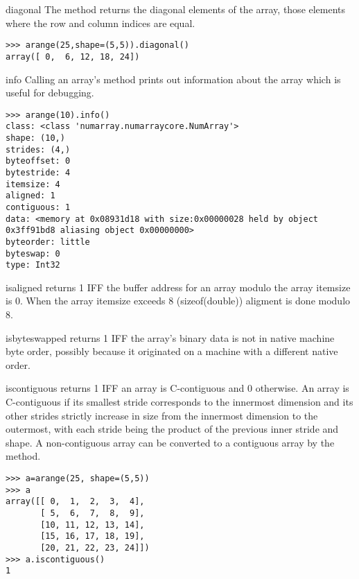 \begin{methoddesc}[numarray]{diagonal}{}
  \label{arraymethod:diagonal}
   The  method returns the diagonal elements of the array,
   those elements where the row and column indices are equal.
\begin{verbatim}
>>> arange(25,shape=(5,5)).diagonal()
array([ 0,  6, 12, 18, 24])
\end{verbatim}
\end{methoddesc}


\begin{methoddesc}[numarray]{info}{}
   \label{arraymethod:info} Calling an array's 
   method prints out information about the array which is useful for debugging.
\begin{verbatim}
>>> arange(10).info()
class: <class 'numarray.numarraycore.NumArray'>
shape: (10,)
strides: (4,)
byteoffset: 0
bytestride: 4
itemsize: 4
aligned: 1
contiguous: 1
data: <memory at 0x08931d18 with size:0x00000028 held by object 0x3ff91bd8 aliasing object 0x00000000>
byteorder: little
byteswap: 0
type: Int32
\end{verbatim}
\end{methoddesc}


\begin{methoddesc}[numarray]{isaligned}{}
  \label{arraymethod:isaligned}  returns 1 IFF the buffer
  address for an array modulo the array itemsize is 0.  When the array
  itemsize exceeds 8 (sizeof(double)) aligment is done modulo 8.
\end{methoddesc}


\begin{methoddesc}[numarray]{isbyteswapped}{}
  \label{arraymethod:isbyteswapped}  returns 1 IFF the 
  array's binary data is not in native machine byte order, possibly because it
  originated on a machine with a different native order.
\end{methoddesc}


\begin{methoddesc}[numarray]{iscontiguous}{}
  \label{arraymethod:iscontiguous}  returns 1 IFF
   an array is C-contiguous and 0 otherwise.  An array is C-contiguous if its
   smallest stride corresponds to the innermost dimension and its other strides
   strictly increase in size from the innermost dimension to the outermost,
   with each stride being the product of the previous inner stride and shape.
   A non-contiguous array can be converted to a contiguous array by the
    method.
\begin{verbatim}
>>> a=arange(25, shape=(5,5))
>>> a
array([[ 0,  1,  2,  3,  4],
       [ 5,  6,  7,  8,  9],
       [10, 11, 12, 13, 14],
       [15, 16, 17, 18, 19],
       [20, 21, 22, 23, 24]])
>>> a.iscontiguous()
1
\end{verbatim}
\end{methoddesc}


